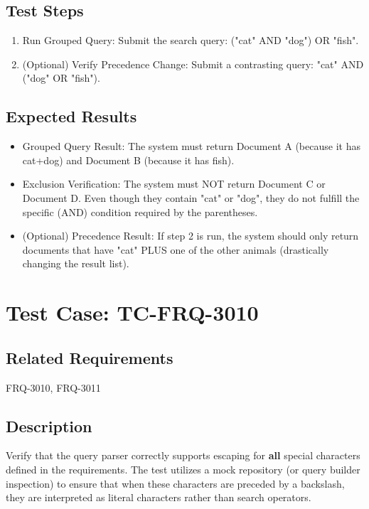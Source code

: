 \documentclass{article}
\begin{document}
\subsection*{Test Steps}
\begin{enumerate}
  \item Run Grouped Query: Submit the search query: ("cat" AND "dog") OR "fish". 
  \item (Optional) Verify Precedence Change: Submit a contrasting query: "cat" AND ("dog" OR "fish").
 \end{enumerate}

\subsection*{Expected Results}
\begin{itemize}
   \item Grouped Query Result: The system must return Document A (because it has cat+dog) and Document B (because it has fish). \item Exclusion Verification: The system must NOT return Document C or Document D. Even though they contain "cat" or "dog", they do not fulfill the specific (AND) condition required by the parentheses. \item (Optional) Precedence Result: If step 2 is run, the system should only return documents that have "cat" PLUS one of the other animals (drastically changing the result list).
 \end{itemize}

\section{Test Case: TC-FRQ-3010}

\subsection*{Related Requirements}
FRQ-3010, FRQ-3011

\subsection*{Description}
Verify that the query parser correctly supports escaping for \textbf{all} special characters defined in the requirements. 
The test utilizes a mock repository (or query builder inspection) 
to ensure that when these characters are preceded by a backslash, they are interpreted as literal characters rather than search operators.
\end{document}
